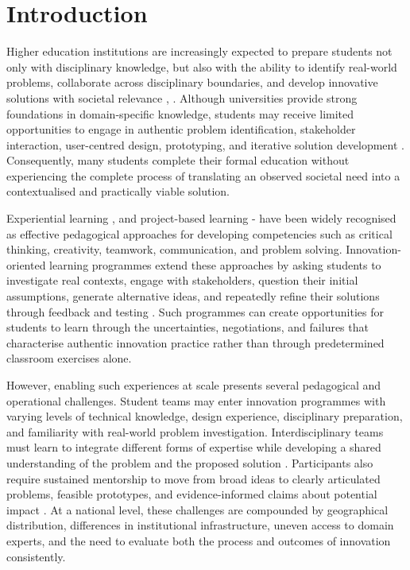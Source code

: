 \documentclass[runningheads]{llncs}
\begin{document}
\begin{abstract}
\sloppy
{}
\end{abstract}



\section{Introduction}

Higher education institutions are increasingly expected to prepare students not only with disciplinary knowledge, but also with the ability to identify real-world problems, collaborate across disciplinary boundaries, and develop innovative solutions with societal relevance \cite{b1}, \cite{b2}. Although universities provide strong foundations in domain-specific knowledge, students may receive limited opportunities to engage in authentic problem identification, stakeholder interaction, user-centred design, prototyping, and iterative solution development \cite{b3}. Consequently, many students complete their formal education without experiencing the complete process of translating an observed societal need into a contextualised and practically viable solution.

Experiential learning \cite{b4}, \cite{b5} and project-based learning \cite{b6}-\cite{b8} have been widely recognised as effective pedagogical approaches for developing competencies such as critical thinking, creativity, teamwork, communication, and problem solving. Innovation-oriented learning programmes extend these approaches by asking students to investigate real contexts, engage with stakeholders, question their initial assumptions, generate alternative ideas, and repeatedly refine their solutions through feedback and testing \cite{b9,b10,b11}. Such programmes can create opportunities for students to learn through the uncertainties, negotiations, and failures that characterise authentic innovation practice rather than through predetermined classroom exercises alone.

However, enabling such experiences at scale presents several pedagogical and operational challenges. Student teams may enter innovation programmes with varying levels of technical knowledge, design experience, disciplinary preparation, and familiarity with real-world problem investigation. Interdisciplinary teams must learn to integrate different forms of expertise while developing a shared understanding of the problem and the proposed solution \cite{b13}. Participants also require sustained mentorship to move from broad ideas to clearly articulated problems, feasible prototypes, and evidence-informed claims about potential impact \cite{b12}. At a national level, these challenges are compounded by geographical distribution, differences in institutional infrastructure, uneven access to domain experts, and the need to evaluate both the process and outcomes of innovation consistently.
\end{document}
